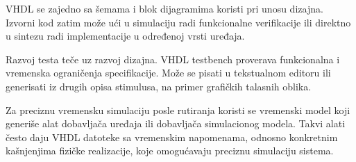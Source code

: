 VHDL se zajedno sa šemama i blok dijagramima koristi pri unosu dizajna. Izvorni kod zatim može ući u simulaciju radi funkcionalne verifikacije ili direktno u sintezu radi implementacije u određenoj vrsti uređaja.

Razvoj testa teče uz razvoj dizajna. VHDL testbench proverava funkcionalna i vremenska ograničenja specifikacije. Može se pisati u tekstualnom editoru ili generisati iz drugih opisa stimulusa, na primer grafičkih talasnih oblika.

Za preciznu vremensku simulaciju posle rutiranja koristi se vremenski model koji generiše alat dobavljača uređaja ili dobavljača simulacionog modela. Takvi alati često daju VHDL datoteke sa vremenskim napomenama, odnosno konkretnim kašnjenjima fizičke realizacije, koje omogućavaju preciznu simulaciju sistema.
